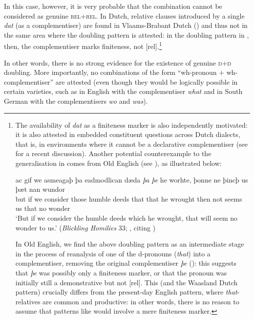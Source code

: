 \documentclass[output=paper]{langscibook}
\begin{document}
\noindent In this case, however, it is very probable that the combination cannot be considered as genuine \textsc{rel}$+$\textsc{rel}. In Dutch, relative clauses introduced by a single \textit{dat} (as a complementiser) are found in Vlaams-Brabant Dutch (\citealt{boef2013}) and thus not in the same area where the doubling pattern is attested: in the doubling pattern in , then, the complementiser marks finiteness, not [rel].\footnote{The availability of \textit{dat} as a finiteness marker is also independently motivated: it is also attested in embedded constituent questions across Dutch dialects, that is, in environments where it cannot be a declarative complementiser (see \citealt{schallertdroegepheiff2018} for a recent discussion). Another potential counterexample to the generalisation in  comes from Old English (see \citealt{vangelderen2009}), as illustrated below:

\ea \gll ac gif we asmeagaþ þa eadmodlican dæda \textit{þa} \textit{þe} he worhte, þonne ne þincþ us þæt nan wundor\\
but if we consider those humble deeds that that he wrought then not seems us that no wonder\\
\glt `But if we consider the humble deeds which he wrought, that will seem no wonder to us.' \hfill (\textit{Blickling Homilies} 33; \citealt[364]{watanabe2009}, citing \citealt{allen1980})
\z

\noindent In Old English, we find the above doubling pattern as an intermediate stage in the process of reanalysis of one of the d-pronouns (\textit{that}) into a complementiser, removing the original complementiser \textit{þe} (\citealt{vangelderen2009}): this suggests that \textit{þe} was possibly only a finiteness marker, or that the pronoun was initially still a demonstrative but not [rel]. This (and the Waasland Dutch pattern) crucially differs from the present-day English pattern, where \textit{that}-relatives are common and productive: in other words, there is no reason to assume that patterns like  would involve a mere finiteness marker.}

In other words, there is no strong evidence for the existence of genuine \textsc{d}$+$\textsc{d} doubling. More importantly, no combinations of the form ``wh-pronoun $+$ wh-complementiser'' are attested (even though they would be logically possible in certain varieties, such as in English with the complementiser \textit{what} and in South German with the complementisers \textit{wo} and \textit{was}).
\end{document}
